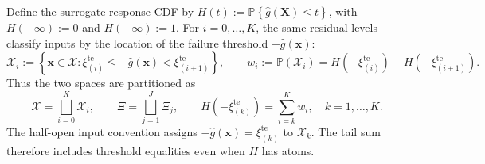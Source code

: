 Define the surrogate-response CDF by $H(t):=\mathbb P\left\{\hat g(\bm X)\le t\right\}$, with $H(-\infty):=0$ and $H(+\infty):=1$. For $i=0,\ldots,K$, the same residual levels classify inputs by the location of the failure threshold $-\hat g(\bm x)$:
\begin{equation}
  \mathcal X_i:=\left\{\bm x\in\mathcal X:
    \xi_{(i)}^{\mathrm{te}}\le-\hat g(\bm x)<\xi_{(i+1)}^{\mathrm{te}}\right\},
  \qquad
  w_i:=\mathbb P(\mathcal X_i)
    =H\left(-\xi_{(i)}^{\mathrm{te}}\right)-H\left(-\xi_{(i+1)}^{\mathrm{te}}\right).
  \label{eq-input-cells}
\end{equation}
Thus the two spaces are partitioned as
\[
  \mathcal X=\bigsqcup_{i=0}^{K}\mathcal X_i,
  \qquad
  \Xi=\bigsqcup_{j=1}^{J}\Xi_j,
  \qquad
  H\left(-\xi_{(k)}^{\mathrm{te}}\right)=\sum_{i=k}^{K}w_i,
  \quad k=1,\ldots,K.
\]
The half-open input convention assigns $-\hat g(\bm x)=\xi_{(k)}^{\mathrm{te}}$ to $\mathcal X_k$. The tail sum therefore includes threshold equalities even when $H$ has atoms.

